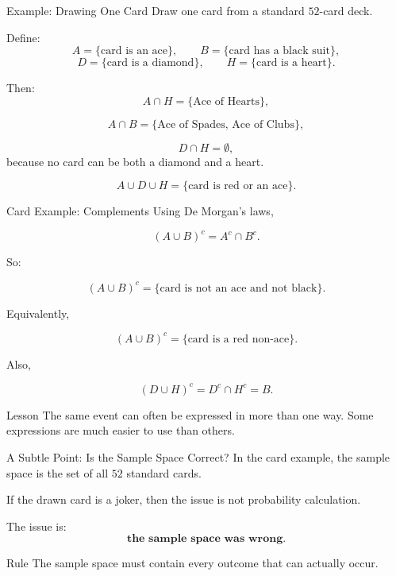 \begin{frame}{Example: Drawing One Card}
Draw one card from a standard $52$-card deck.

Define:
\[
A = \{\text{card is an ace}\},
\qquad
B = \{\text{card has a black suit}\},
\]
\[
D = \{\text{card is a diamond}\},
\qquad
H = \{\text{card is a heart}\}.
\]

Then:
\[
A \cap H = \{\text{Ace of Hearts}\},
\]

\[
A \cap B = \{\text{Ace of Spades, Ace of Clubs}\},
\]

\[
D \cap H = \emptyset,
\]
because no card can be both a diamond and a heart.

\[
A \cup D \cup H = \{\text{card is red or an ace}\}.
\]
\end{frame}

\begin{frame}{Card Example: Complements}
Using De Morgan's laws,

\[
(A \cup B)^c = A^c \cap B^c.
\]

So:

\[
(A \cup B)^c
=
\{\text{card is not an ace and not black}\}.
\]

Equivalently,

\[
(A \cup B)^c
=
\{\text{card is a red non-ace}\}.
\]

Also,

\[
(D \cup H)^c = D^c \cap H^c = B.
\]

\begin{keybox}{Lesson}
The same event can often be expressed in more than one way. Some expressions are much easier to use than others.
\end{keybox}
\end{frame}

\begin{frame}{A Subtle Point: Is the Sample Space Correct?}
In the card example, the sample space is the set of all $52$ standard cards.

\vspace{0.3cm}

If the drawn card is a joker, then the issue is not probability calculation.

\vspace{0.2cm}

The issue is:
\[
\textbf{the sample space was wrong.}
\]

\vspace{0.3cm}

\begin{keybox}{Rule}
The sample space must contain every outcome that can actually occur.
\end{keybox}
\end{frame}


